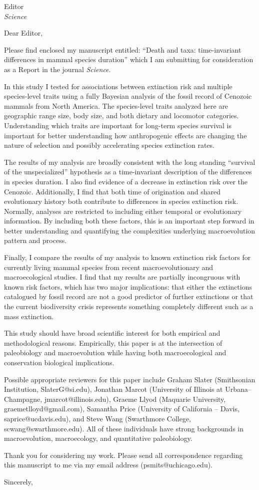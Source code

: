 \documentclass{letter}
\begin{document}
\begin{letter}{Editor \\ \textit{Science}}
  \opening{Dear Editor,}

  Please find enclosed my manuscript entitled: ``Death and taxa: time-invariant differences in mammal species duration'' which I am submitting for consideration as a Report in the journal \textit{Science}.

  In this study I tested for associations between extinction risk and multiple species-level traits using a fully Bayesian analysis of the fossil record of Cenozoic mammals from North America. The species-level traits analyzed here are geographic range size, body size, and both dietary and locomotor categories. Understanding which traits are important for long-term species survival is important for better understanding how anthropogenic effects are changing the nature of selection and possibly accelerating species extinction rates.
  
  The results of my analysis are broadly consistent with the long standing ``survival of the unspecialized'' hypothesis as a time-invariant description of the differences in species duration. I also find evidence of a decrease in extinction risk over the Cenozoic. Additionally, I find that both time of origination and shared evolutionary history both contribute to differences in species extinction risk. Normally, analyses are restricted to including either temporal or evolutionary information. By including both these factors, this is an important step forward in better understanding and quantifying the complexities underlying macroevolution pattern and process.
  
  Finally, I compare the results of my analysis to known extinction risk factors for currently living mammal species from recent macroevolutionary and macroecological studies. I find that my results are partially incongruous with known risk factors, which has two major implications: that either the extinctions catalogued by fossil record are not a good predictor of further extinctions or that the current biodiversity crisis represents something completely different such as a mass extinction.

  This study should have broad scientific interest for both empirical and methodological reasons. Empirically, this paper is at the intersection of paleobiology and macroevolution while having both macroecological and conservation biological implications. 

  Possible appropriate reviewers for this paper include Graham Slater (Smithsonian Institution, SlaterG@si.edu), Jonathan Marcot (University of Illinois at Urbana--Champagne, jmarcot@illinois.edu), Graeme Llyod (Maquarie University, graemetlloyd@gmail.com), Samantha Price (University of California -- Davis, saprice@ucdavis.edu), and Steve Wang (Swarthmore College, scwang@swarthmore.edu). All of these individuals have strong backgrounds in macroevolution, macroecology, and quantitative paleobiology. 

  Thank you for considering my work. Please send all correspondence regarding this manuscript to me via my email address (psmits@uchicago.edu).

  \closing{Sincerely,}

\end{letter}
\end{document}
